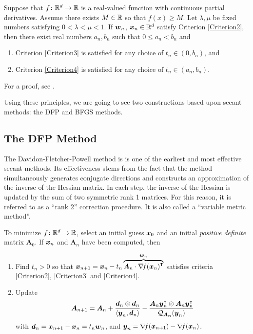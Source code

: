 \begin{theorem}[Wolfe]\label{theorem:Wolfe}
Suppose that $f \colon \mathbb{R}^d \to \mathbb{R}$ is a real-valued function with continuous partial derivatives.  Assume there exists $M \in \mathbb{R}$ so that $f(x) \geq M$.  Let $\lambda, \mu$ be fixed numbers satisfying $0 < \lambda < \mu < 1$.  If $\boldsymbol{w}_n$, $\boldsymbol{x}_n \in \mathbb{R}^d$ satisfy Criterion \eqref{Criterion2}, then there exist real numbers $a_n, b_n$ such that $0 \leq a_n < b_n$ and
\begin{enumerate}
	\item Criterion \eqref{Criterion3} is satisfied for any choice of $t_n \in (0, b_n)$, and
	\item Criterion \eqref{Criterion4} is satisfied for any choice of $t_n \in (a_n, b_n)$.
\end{enumerate}
\end{theorem}

\begin{remark}
For a proof, see \cite[Theorem 3.3.1]{peressini1988mathematics}.
\end{remark}

Using these principles, we are going to see two constructions based upon secant methods: the DFP and BFGS methods.

\subsection{The DFP Method}
The Davidon-Fletcher-Powell method is is one of the earliest and most effective secant methods. Its effectiveness stems from the fact that the method simultaneously generates conjugate directions and constructs an approximation of the inverse of the Hessian matrix. In each step, the inverse of the Hessian is updated by the sum of two symmetric rank 1 matrices. For this reason, it is referred to as a “rank 2” correction procedure. It is also called a “variable metric method”.

To minimize $f \colon \mathbb{R}^d \to \mathbb{R}$, select an initial guess $\boldsymbol{x}_0$ and an initial \emph{positive definite} matrix $\boldsymbol{A}_0$.  If $\boldsymbol{x}_n$ and $\boldsymbol{A}_n$ have been computed, then 
\begin{enumerate}
	\item Find $t_n>0$ so that $\boldsymbol{x}_{n+1} = \boldsymbol{x}_n - t_n \overbrace{\boldsymbol{A}_n \cdot {\mathop{\nabla\! {f}}(\boldsymbol{x}_n)}^\intercal}^{\boldsymbol{w}_n}$ satisfies criteria \eqref{Criterion2}, \eqref{Criterion3} and \eqref{Criterion4}.
	\item Update
	\begin{equation}\label{equation:DFP}
	\boldsymbol{A}_{n+1} = \boldsymbol{A}_n + \frac{\boldsymbol{d}_n \otimes \boldsymbol{d}_n}{\langle \boldsymbol{y}_n, \boldsymbol{d}_n \rangle } - \frac{\boldsymbol{A}_n {\boldsymbol{y}}^\intercal_n \otimes \boldsymbol{A}_n {\boldsymbol{y}}^\intercal_n }{\mathcal{Q}_{\boldsymbol{\boldsymbol{A}_n}}(\boldsymbol{y}_n)}
	\end{equation}
	with $\boldsymbol{d}_n = \boldsymbol{x}_{n+1}-\boldsymbol{x}_n= t_n\boldsymbol{w}_n$, and $\boldsymbol{y}_n = \mathop{\nabla\! {f}}(\boldsymbol{x}_{n+1}) - \mathop{\nabla\! {f}}(\boldsymbol{x}_n)$.
\end{enumerate}

